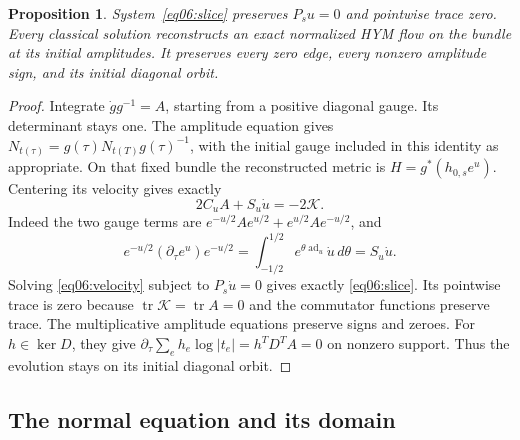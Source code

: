 \documentclass[11pt]{amsart}
\newtheorem{proposition}[theorem]{Proposition}
\theoremstyle{definition}
\theoremstyle{remark}
\newcommand{\cK}{\mathcal K}
\newcommand{\tr}{\operatorname{tr}}
\newcommand{\ad}{\operatorname{ad}}
\begin{document}
\begin{proposition}\label{prop06:exact}
System~\eqref{eq06:slice} preserves \(P_su=0\) and pointwise trace
zero. Every classical solution reconstructs an exact normalized HYM
flow on the bundle at its initial amplitudes. It preserves every zero
edge, every nonzero amplitude sign, and its initial diagonal orbit.
\end{proposition}

\begin{proof}
Integrate \(\dot gg^{-1}=A\), starting from a positive diagonal
gauge. Its determinant stays one. The amplitude equation gives
\(N_{t(\tau)}=g(\tau)N_{t(T)}g(\tau)^{-1}\), with the initial
gauge included in this identity as appropriate. On that fixed bundle
the reconstructed metric is \(H=g^*(h_{0,s}e^u)\). Centering its
velocity gives exactly
\begin{equation}\label{eq06:velocity}
 2C_uA+S_u\dot u=-2\cK.
\end{equation}
Indeed the two gauge terms are
\(e^{-u/2}Ae^{u/2}+e^{u/2}Ae^{-u/2}\), and
\[
 e^{-u/2}(\partial_\tau e^u)e^{-u/2}
   =\int_{-1/2}^{1/2}e^{\theta\ad_u}\dot u\,d\theta=S_u\dot u.
\]
Solving \eqref{eq06:velocity} subject to \(P_s\dot u=0\) gives
exactly \eqref{eq06:slice}. Its pointwise trace is zero because
\(\tr\cK=\tr A=0\) and the commutator functions preserve trace.
The multiplicative amplitude equations preserve signs and zeroes.
For \(h\in\ker D\), they give
\(\partial_\tau\sum_eh_e\log|t_e|=h^TD^TA=0\) on nonzero
support. Thus the evolution stays on its initial diagonal orbit.
\end{proof}

\subsection{The normal equation and its domain}
\end{document}
